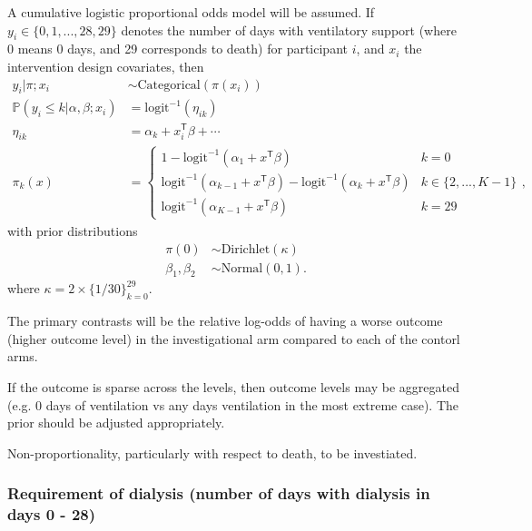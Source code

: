 \documentclass[11pt,parskip=half-]{scrartcl}
\begin{document}
A cumulative logistic proportional odds model will be assumed. If $y_i\in\{0,1,...,28,29\}$ denotes the number of days with ventilatory support (where 0 means 0 days, and 29 corresponds to death) for participant $i$, and $x_i$ the intervention design covariates, then
$$
    \begin{aligned}
        y_{i} | \pi;x_i                            & \sim \text{Categorical}(\pi(x_i))           \\
        \mathbb P(y_i \leq k | \alpha, \beta; x_i) & = \text{logit}^{-1}(\eta_{ik})              \\
        \eta_{ik}                                  & = \alpha_k + x_i^{\mathsf{T}}\beta + \cdots \\
        \pi_k(x)                                   & = \begin{cases}
            1 - \text{logit}^{-1}(\alpha_1 + x^\mathsf{T}\beta)                                                     & k=0               \\
            \text{logit}^{-1}(\alpha_{k-1} + x^\mathsf{T}\beta) - \text{logit}^{-1}(\alpha_{k} + x^\mathsf{T}\beta) & k\in\{2,...,K-1\} \\
            \text{logit}^{-1}(\alpha_{K-1} + x^\mathsf{T}\beta)                                                     & k=29
        \end{cases},
    \end{aligned}
$$
with prior distributions
$$
    \begin{aligned}
        \pi(0)          & \sim \text{Dirichlet}(\kappa)  \\
        \beta_1,\beta_2 & \sim \text{Normal}(0, 1).
    \end{aligned}
$$
where $\kappa = 2\times \{1/30\}_{k=0}^{29}$.

The primary contrasts will be the relative log-odds of having a worse outcome (higher outcome level) in the investigational arm compared to each of the contorl arms.

If the outcome is sparse across the levels, then outcome levels may be aggregated (e.g. 0 days of ventilation vs any days ventilation in the most extreme case). The prior should be adjusted appropriately. 

Non-proportionality, particularly with respect to death, to be investiated.

\subsubsection{Requirement of dialysis (number of days with dialysis in days 0 - 28)}
\end{document}

